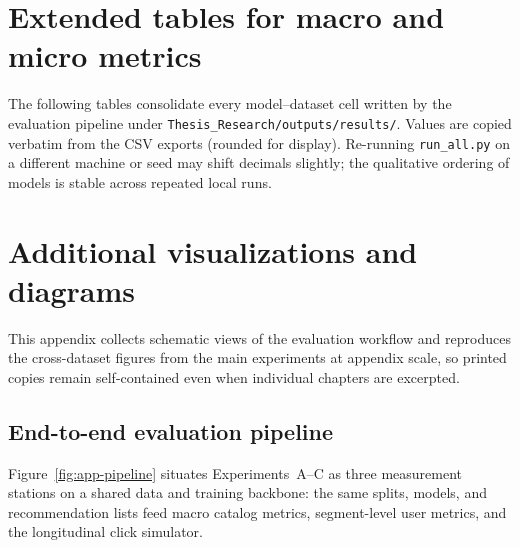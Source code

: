 
\chapter{Extended tables for macro and micro metrics}
\label{app:tables}

The following tables consolidate every model--dataset cell written by the evaluation pipeline under \texttt{Thesis\_Research/outputs/results/}. Values are copied verbatim from the CSV exports (rounded for display). Re-running \texttt{run\_all.py} on a different machine or seed may shift decimals slightly; the qualitative ordering of models is stable across repeated local runs.



\chapter{Additional visualizations and diagrams}
\label{app:viz}

This appendix collects schematic views of the evaluation workflow and reproduces the cross-dataset figures from the main experiments at appendix scale, so printed copies remain self-contained even when individual chapters are excerpted.

\section{End-to-end evaluation pipeline}
Figure~\ref{fig:app-pipeline} situates Experiments~A--C as three measurement stations on a shared data and training backbone: the same splits, models, and recommendation lists feed macro catalog metrics, segment-level user metrics, and the longitudinal click simulator.

